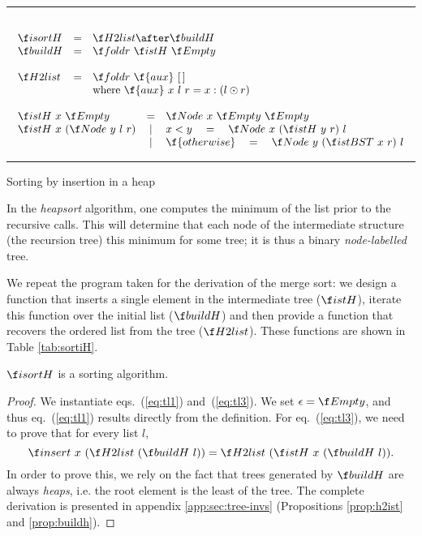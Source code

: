 \documentclass[a4paper,11pt]{llncs}
\begin{document}
\begin{table}[tb]
\hrule
\[
\begin{array}{l}\\
\begin{array}{lcl}
\isortH  & = & \H2list \after \buildH\\ 
\buildH & = & \foldr\ \istH\ \Empty\\ \\
\H2list & = & \foldr\ \f{aux}\ \Nil \\ 
&& \mbox{where } \f{aux}\ x\ l\ r = x:(l \odot r)\\
\end{array} \\ \\
\begin{array}{lcl}
\istH\ x\ \Empty & = &  \Node\ x\ \Empty\ \Empty\\
\istH\ x\ (\Node\ y\ l\ r) & | & x<y\quad=\quad \Node\ x\
(\istH\ y\ r)\ l\\
  & | & \f{otherwise}\quad=\quad \Node\ y\ (\istBST\ x\ r)\ l \\
\end{array}
\end{array}
\]
\hrule
\caption{Sorting by insertion in a heap}
\label{tab:sortiH}
\end{table}

In the \emph{heapsort} algorithm, one computes the minimum of the list
prior to the recursive calls. This will determine that each node of
the intermediate structure (the recursion tree) this minimum for some
tree; it is thus a binary \emph{node-labelled} tree.

We repeat the program taken for the derivation of the merge sort: we
design a function that inserts a single element in the intermediate
tree ($\istH$), iterate this function over the initial list
($\buildH$) and then provide a function that recovers the ordered list
from the tree ($\H2list$). These functions are shown in Table
\ref{tab:sortiH}.

\begin{proposition}
  $\isortH$ is a sorting algorithm.  
\end{proposition}
\begin{proof}
  We instantiate eqs.~(\ref{eq:tl1}) and~(\ref{eq:tl3}). We set
  $\epsilon = \Empty$, and thus eq.~(\ref{eq:tl1}) results directly
  from the definition. For eq.~(\ref{eq:tl3}), we need to prove that
  for every list $l$,
  \[ \insert\ x\ (\H2list\ (\buildH\ l)) = \H2list\ (\istH\ x \
  (\buildH\ l)). \] In order to prove this, we rely on the fact that
  trees generated by $\buildH$ are always \emph{heaps}, i.e. the root
  element is the least of the tree. The complete derivation is
  presented in appendix \ref{app:sec:tree-invs} (Propositions
  \ref{prop:h2ist} and \ref{prop:buildh}).
\end{proof}  
\end{document}
